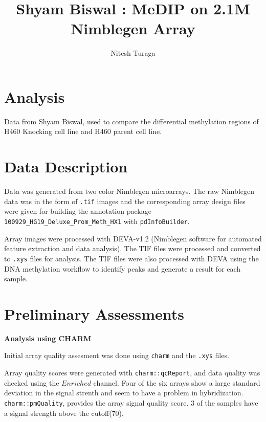 \documentclass[11pt]{article}
\begin{document}
\raggedright


\newcommand\NAME{Turaga}  %
\newcommand\ANDREWID{nturaga1@jhmi.edu}     %

\title{Shyam Biswal : MeDIP on 2.1M Nimblegen Array}
\author{Nitesh Turaga}
\maketitle
\section*{Analysis}

Data from Shyam Biswal, used to compare the differential methylation regions of H460 Knocking cell line and H460 parent cell line.

\section*{Data Description}

Data was generated from two color Nimblegen microarrays. The raw Nimblegen data was in the form of {\tt .tif} images and the corresponding array design files were given for building the annotation package {\tt 100929\_HG19\_Deluxe\_Prom\_Meth\_HX1}  with {\tt pdInfoBuilder}.

Array images were processed with DEVA-v1.2 (Nimblegen software for automated feature extraction and data analysis). The TIF files were processed and converted to {\tt .xys} files for analysis. The TIF files were also processed with DEVA using the DNA methylation workflow to identify peaks and generate a result for each sample.


\section*{Preliminary Assessments}

{\bf Analysis using CHARM}

Initial array quality assesment was done using {\tt charm} and the {\tt .xys} files. 

Array quality scores were generated with {\tt charm::qcReport}, and data quality was checked using the $Enriched$ channel. Four of the six arrays show a large standard deviation in the signal strenth and seem to have a problem in hybridization. {\tt charm::pmQuality}, provides the array signal quality score. 3 of the samples have a signal strength above the cutoff(70).
\end{document}
